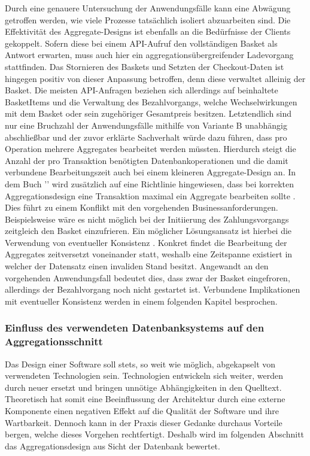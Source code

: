 Durch eine genauere Untersuchung der Anwendungsfälle kann eine Abwägung getroffen werden, wie viele Prozesse tatsächlich isoliert abzuarbeiten sind. Die Effektivität des Aggregate-Designs ist ebenfalls an die Bedürfnisse der Clients gekoppelt. Sofern diese bei einem API-Aufruf den vollständigen Basket als Antwort erwarten, muss auch hier ein aggregationsübergreifender Ladevorgang stattfinden. Das Stornieren des Baskets und Setzten der Checkout-Daten ist hingegen positiv von dieser Anpassung betroffen, denn diese verwaltet alleinig der Basket. Die meisten API-Anfragen beziehen sich allerdings auf beinhaltete BasketItems und die Verwaltung des Bezahlvorgangs, welche Wechselwirkungen mit dem Basket oder sein zugehöriger Gesamtpreis besitzen. Letztendlich sind nur eine Bruchzahl der Anwendungsfälle mithilfe von Variante B unabhängig abschließbar und der zuvor erklärte Sachverhalt würde dazu führen, dass pro Operation mehrere Aggregates bearbeitet werden müssten. Hierdurch steigt die Anzahl der pro Transaktion benötigten Datenbankoperationen und die damit verbundene Bearbeitungszeit auch bei einem kleineren Aggregate-Design an. In dem Buch '' wird zusätzlich auf eine Richtlinie hingewiesen, dass bei korrekten Aggregationsdesign eine Transaktion maximal ein Aggregate bearbeiten sollte \cite[S. 354]{Vernon.2015}. Dies führt zu einem Konflikt mit den vorgehenden Businessanforderungen. Beispielsweise wäre es nicht möglich bei der Initiierung des Zahlungsvorgangs zeitgleich den Basket einzufrieren. Ein möglicher Lösungsansatz ist hierbei die Verwendung von eventueller Konsistenz \cite[S. 364]{Vernon.2015}. Konkret findet die Bearbeitung der Aggregates zeitversetzt voneinander statt, weshalb eine Zeitspanne existiert in welcher der Datensatz einen invaliden Stand besitzt. Angewandt an den vorgehenden Anwendungsfall bedeutet dies, dass zwar der Basket eingefroren, allerdings der Bezahlvorgang noch nicht gestartet ist. Verbundene Implikationen mit eventueller Konsistenz werden in einem folgenden Kapitel besprochen.

\subsubsection{Einfluss des verwendeten Datenbanksystems auf den Aggregationsschnitt}

Das Design einer Software soll stets, so weit wie möglich, abgekapselt von verwendeten Technologien sein. Technologien entwickeln sich weiter, werden durch neuer ersetzt und bringen unnötige Abhängigkeiten in den Quelltext. Theoretisch hat somit eine Beeinflussung der Architektur durch eine externe Komponente einen negativen Effekt auf die Qualität der Software und ihre Wartbarkeit. Dennoch kann in der Praxis dieser Gedanke durchaus Vorteile bergen, welche dieses Vorgehen rechtfertigt. Deshalb wird im folgenden Abschnitt das Aggregationsdesign aus Sicht der Datenbank bewertet.

